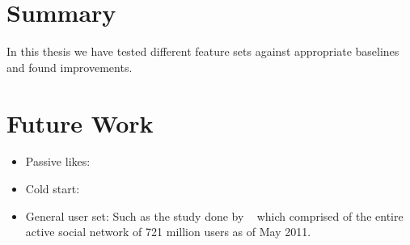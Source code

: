 

\section{Summary}
\label{sec:summary}

In this thesis we have tested different feature sets against appropriate baselines and found improvements.

\section{Future Work}
\label{sec:fw}

\begin{itemize}
\item Passive likes: 
\item Cold start: 
\item General user set: Such as the study done by ~\cite{jugand} which comprised of the entire active social network of 721 million users 
as of May 2011.
\end{itemize}


